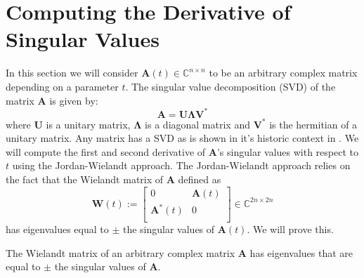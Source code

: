 \documentclass[a4paper, oneside]{discothesis}
\begin{document}
\section{Computing the Derivative of Singular Values} \label{sec:svder}
In this section we will consider $\mathbf{A}(t) \in \mathbb{C}^{n \times n}$ to be an arbitrary complex matrix depending on a parameter $t$.
The singular value decomposition (SVD) of the matrix  $\mathbf{A}$ is given by:
\begin{equation}
	\mathbf{A} = \mathbf{U}\boldsymbol{\Lambda}\mathbf{V}^* \label{svd}
\end{equation}
where $\mathbf{U}$ is a unitary matrix, $\boldsymbol{\Lambda}$ is a diagonal matrix and $\mathbf{V}^*$ is the hermitian of a unitary matrix. 
Any matrix has a SVD as is shown in it's historic context in \cite{Stewart92onthe}.
We will compute the first and second derivative of $\mathbf{A}$'s singular values with respect to $t$ using the Jordan-Wielandt approach.
The Jordan-Wielandt approach relies on the fact that the Wielandt matrix of $\mathbf{A}$ defined as
\begin{equation}
	\mathbf{W}(t) := 
	\begin{bmatrix}
		0 & \mathbf{A}(t) \\
		\mathbf{A}^*(t) & 0 \\
	\end{bmatrix}
	\in \mathbb{C}^{2n \times 2n}
\end{equation}
has eigenvalues equal to $\pm$ the singular values of $\mathbf{A}(t)$.
We will prove this.
\begin{theorem}\label{thm:svd}
	The Wielandt matrix of an arbitrary complex matrix $\mathbf{A}$ has eigenvalues that are equal to $\pm$ the singular values of $\mathbf{A}$.
\end{theorem}
\end{document}
